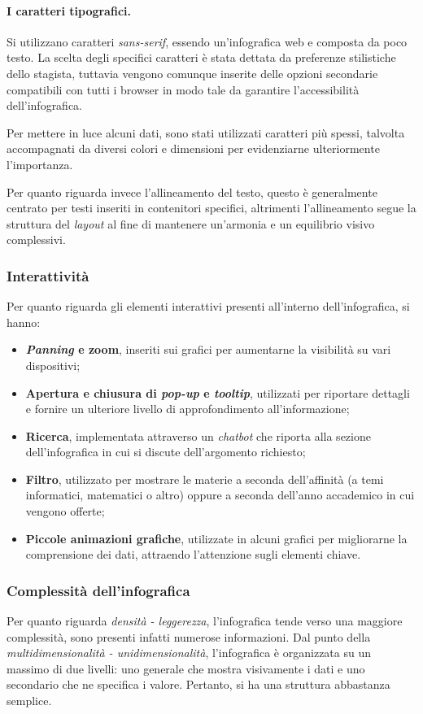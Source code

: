\paragraph{I caratteri tipografici.} Si utilizzano caratteri \emph{sans-serif}, essendo un'infografica web e composta da poco testo. La scelta degli specifici caratteri è stata dettata da preferenze stilistiche
dello stagista, tuttavia vengono comunque inserite delle opzioni secondarie compatibili con tutti i browser in modo tale da garantire l'accessibilità dell'infografica.

Per mettere in luce alcuni dati, sono stati utilizzati caratteri più spessi, talvolta accompagnati da diversi colori e dimensioni per evidenziarne ulteriormente l'importanza.

Per quanto riguarda invece l'allineamento del testo, questo è generalmente centrato per testi inseriti in contenitori specifici, altrimenti l'allineamento segue
la struttura del \emph{layout} al fine di mantenere un'armonia e un equilibrio visivo complessivi.

\subsubsection{Interattività}
Per quanto riguarda gli elementi interattivi presenti all'interno dell'infografica, si hanno:
\begin{itemize}
    \item \textbf{\emph{Panning} e zoom}, inseriti sui grafici per aumentarne la visibilità su vari dispositivi;
    \item \textbf{Apertura e chiusura di \emph{pop-up} e \emph{tooltip}}, utilizzati per riportare dettagli e fornire un ulteriore livello di 
    approfondimento all'informazione;
    \item \textbf{Ricerca}, implementata attraverso un \emph{chatbot} che riporta alla sezione dell'infografica in cui si discute dell'argomento richiesto; 
    \item \textbf{Filtro}, utilizzato per mostrare le materie a seconda dell'affinità (a temi informatici, matematici o altro) oppure a seconda dell'anno 
    accademico in cui vengono offerte;
    \item \textbf{Piccole animazioni grafiche}, utilizzate in alcuni grafici per migliorarne la comprensione dei dati, attraendo l'attenzione sugli elementi chiave.
\end{itemize}

\subsubsection{Complessità dell'infografica}
Per quanto riguarda \emph{densità - leggerezza}, l'infografica tende verso una maggiore complessità, sono presenti infatti numerose informazioni.
Dal punto della \emph{multidimensionalità - unidimensionalità}, l'infografica è organizzata su un massimo di due livelli: uno generale che mostra visivamente i dati e 
uno secondario che ne specifica i valore. Pertanto, si ha una struttura abbastanza semplice.

